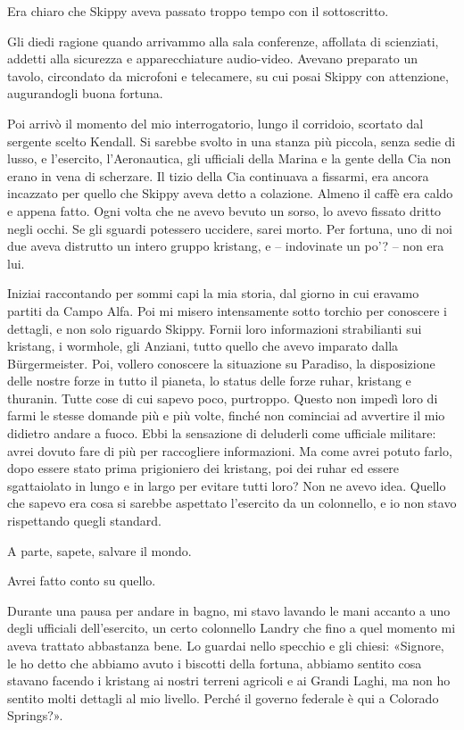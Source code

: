 Era chiaro che Skippy aveva passato troppo tempo con il sottoscritto.

Gli diedi ragione quando arrivammo alla sala conferenze, affollata di
scienziati, addetti alla sicurezza e apparecchiature audio-video.
Avevano preparato un tavolo, circondato da microfoni e telecamere, su
cui posai Skippy con attenzione, augurandogli buona fortuna.

Poi arrivò il momento del mio interrogatorio, lungo il corridoio,
scortato dal sergente scelto Kendall. Si sarebbe svolto in una stanza
più piccola, senza sedie di lusso, e l'esercito, l'Aeronautica, gli
ufficiali della Marina e la gente della Cia non erano in vena di
scherzare. Il tizio della Cia continuava a fissarmi, era ancora
incazzato per quello che Skippy aveva detto a colazione. Almeno il caffè
era caldo e appena fatto. Ogni volta che ne avevo bevuto un sorso, lo
avevo fissato dritto negli occhi. Se gli sguardi potessero uccidere,
sarei morto. Per fortuna, uno di noi due aveva distrutto un intero
gruppo kristang, e -- indovinate un po'? -- non era lui.

Iniziai raccontando per sommi capi la mia storia, dal giorno in cui
eravamo partiti da Campo Alfa. Poi mi misero intensamente sotto torchio
per conoscere i dettagli, e non solo riguardo Skippy. Fornii loro
informazioni strabilianti sui kristang, i wormhole, gli Anziani, tutto
quello che avevo imparato dalla Bürgermeister. Poi, vollero conoscere la
situazione su Paradiso, la disposizione delle nostre forze in tutto il
pianeta, lo status delle forze ruhar, kristang e thuranin. Tutte cose di
cui sapevo poco, purtroppo. Questo non impedì loro di farmi le stesse
domande più e più volte, finché non cominciai ad avvertire il mio
didietro andare a fuoco. Ebbi la sensazione di deluderli come ufficiale
militare: avrei dovuto fare di più per raccogliere informazioni. Ma come
avrei potuto farlo, dopo essere stato prima prigioniero dei kristang,
poi dei ruhar ed essere sgattaiolato in lungo e in largo per evitare
tutti loro? Non ne avevo idea. Quello che sapevo era cosa si sarebbe
aspettato l'esercito da un colonnello, e io non stavo rispettando quegli
standard.

A parte, sapete, salvare il mondo.

Avrei fatto conto su quello.

\hfill\break

Durante una pausa per andare in bagno, mi stavo lavando le mani accanto
a uno degli ufficiali dell'esercito, un certo colonnello Landry che fino
a quel momento mi aveva trattato abbastanza bene. Lo guardai nello
specchio e gli chiesi: «Signore, le ho detto che abbiamo avuto i
biscotti della fortuna, abbiamo sentito cosa stavano facendo i kristang
ai nostri terreni agricoli e ai Grandi Laghi, ma non ho sentito molti
dettagli al mio livello. Perché il governo federale è qui a Colorado
Springs?».

